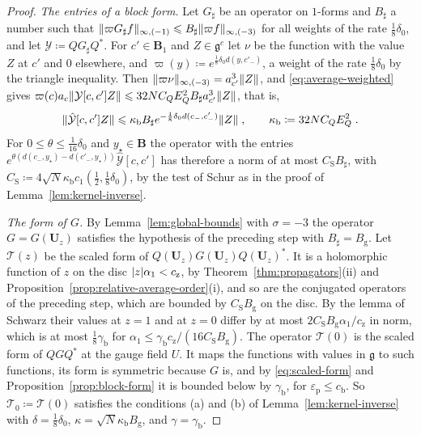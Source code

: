 \documentclass[11pt]{preprint}
\DeclarePairedDelimiter{\abs}{\lvert}{\rvert}
\DeclarePairedDelimiter{\norm}{\lVert}{\rVert}
\numberwithin{equation}{section}
\begin{document}
\begin{proof}
\emph{The entries of a block form.} Let $G_\sharp$ be an operator on $1$-forms and $B_\sharp$ a number such that $\norm{\varpi G_\sharp f}_{\infty,(-1)} \leqslant B_\sharp\norm{\varpi f}_{\infty,(-3)}$ for all weights of the rate $\frac{1}{8}\delta_0$, and let $\mathcal Y \coloneqq QG_\sharp Q^*$. For $c' \in \mathbf B_1$ and $Z \in \mathfrak g^c$ let $\nu$ be the function with the value $Z$ at $c'$ and $0$ elsewhere, and $\varpi(y) \coloneqq e^{\frac{1}{8}\delta_0d(y, c'_-)}$, a weight of the rate $\frac{1}{8}\delta_0$ by the triangle inequality. Then $\norm{\varpi\nu}_{\infty,(-3)} = a_{c'}^3\norm Z$, and \eqref{eq:average-weighted} gives $\varpi(c)a_c\norm{\mathcal Y[c, c']Z} \leqslant 32NC_QE_Q^2B_\sharp a_{c'}^3\norm Z$, that is,
\begin{equation}\label{eq:block-entries}
    \norm{\hat{\mathcal Y}[c, c']Z} \leqslant \kappa_{\mathrm b}B_\sharp e^{-\frac{1}{8}\delta_0d(c_-, c'_-)}\norm Z\;,
    \qquad
    \kappa_{\mathrm b} \coloneqq 32NC_QE_Q^2\;.
\end{equation}
For $0 \leqslant \theta \leqslant \frac{1}{16}\delta_0$ and $y_\star \in \mathbf B$ the operator with the entries $e^{\theta(d(c_-, y_\star) - d(c'_-, y_\star))}\hat{\mathcal Y}[c, c']$ has therefore a norm of at most $C_{\mathrm S}B_\sharp$, with $C_{\mathrm S} \coloneqq 4\sqrt N\kappa_{\mathrm b}c_1(\frac{1}{2}, \frac{1}{8}\delta_0)$, by the test of Schur as in the proof of Lemma~\ref{lem:kernel-inverse}.

\emph{The form of $G$.} By Lemma~\ref{lem:global-bounds} with $\sigma = -3$ the operator $G = G(\mathbf U_z)$ satisfies the hypothesis of the preceding step with $B_\sharp = B_{\mathrm g}$. Let $\mathcal T(z)$ be the scaled form of $Q(\mathbf U_z)G(\mathbf U_z)Q(\mathbf U_z)^*$. It is a holomorphic function of $z$ on the disc $\abs z\alpha_1 < c_{\mathrm z}$, by Theorem~\ref{thm:propagators}(ii) and Proposition~\ref{prop:relative-average-order}(i), and so are the conjugated operators of the preceding step, which are bounded by $C_{\mathrm S}B_{\mathrm g}$ on the disc. By the lemma of Schwarz their values at $z = 1$ and at $z = 0$ differ by at most $2C_{\mathrm S}B_{\mathrm g}\alpha_1/c_{\mathrm z}$ in norm, which is at most $\frac{1}{8}\gamma_{\mathrm b}$ for $\alpha_1 \leqslant \gamma_{\mathrm b}c_{\mathrm z}/(16C_{\mathrm S}B_{\mathrm g})$. The operator $\mathcal T(0)$ is the scaled form of $QGQ^*$ at the gauge field $U$. It maps the functions with values in $\mathfrak g$ to such functions, its form is symmetric because $G$ is, and by \eqref{eq:scaled-form} and Proposition~\ref{prop:block-form} it is bounded below by $\gamma_{\mathrm b}$, for $\varepsilon_{\mathrm p} \leqslant c_{\mathrm b}$. So $\mathcal T_0 \coloneqq \mathcal T(0)$ satisfies the conditions (a) and (b) of Lemma~\ref{lem:kernel-inverse} with $\delta = \frac{1}{8}\delta_0$, $\kappa = \sqrt N\kappa_{\mathrm b}B_{\mathrm g}$, and $\gamma = \gamma_{\mathrm b}$.


\end{proof}
\end{document}
